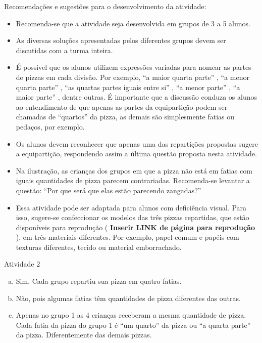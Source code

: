 \documentclass[oneside]{book}
\begin{document}
\begin{multicols}{2}
  Recomendações e sugestões para o desenvolvimento da atividade:

\begin{itemize} %
    \item       Recomenda-se que a atividade seja desenvolvida em grupos de 3 a 5 alunos.
    \item       As diversas soluções apresentadas pelos diferentes grupos devem ser discutidas com a turma inteira.
    \item       É possível que os alunos utilizem expressões variadas para nomear as partes de pizzas em cada divisão. Por exemplo,       ``a maior quarta parte''      ,       ``a menor quarta parte''      ,       ``as quartas partes iguais entre si''      ,       ``a menor parte''      ,       ``a maior parte''      , dentre outras. É importante que a discussão conduza os alunos ao entendimento de que apenas as partes da equipartição podem ser chamadas de       ``quartos''       da pizza, as demais são simplesmente fatias ou pedaços, por exemplo.
    \item       Os alunos devem reconhecer que apenas uma das repartições propostas sugere a equipartição, respondendo assim a última questão proposta nesta atividade.
    \item       Na ilustração, as crianças dos grupos em que a pizza não está em fatias com iguais quantidades de pizza parecem contrariadas. Recomenda-se levantar a questão:       ``Por que será que elas estão parecendo zangadas?''
    \item       Essa atividade pode ser adaptada para alunos com deficiência visual. Para isso, sugere-se confeccionar os modelos das três pizzas repartidas, que estão disponíveis para reprodução (      {\bf Inserir LINK de página para reprodução}      ), em três materiais diferentes. Por exemplo, papel comum e papéis com texturas diferentes, tecido ou material emborrachado.
\end{itemize} %






\begin{resposta*}{Atividade 2}
\begin{enumerate} [a),wide,labelindent=0pt] %
    \item       Sim. Cada grupo repartiu sua pizza em quatro fatias.
    \item       Não, pois algumas fatias têm quantidades de pizza diferentes das outras.
    \item       Apenas no grupo 1 as 4 crianças receberam a mesma quantidade de pizza. Cada fatia da pizza do grupo 1 é       ``um quarto''       da pizza ou       ``a quarta parte''       da pizza. Diferentemente das demais pizzas.
\end{enumerate} %
\end{resposta*}





\end{multicols}
\end{document}
